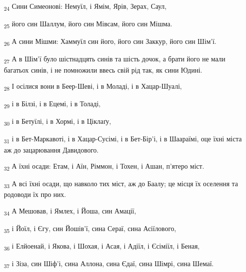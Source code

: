 \begin{tcolorbox}
\textsubscript{24} Сини Симеонові: Немуїл, і Ямім, Ярів, Зерах, Саул,
\end{tcolorbox}
\begin{tcolorbox}
\textsubscript{25} його син Шаллум, його син Мівсам, його син Мішма.
\end{tcolorbox}
\begin{tcolorbox}
\textsubscript{26} А сини Мішми: Хаммуїл син його, його син Заккур, його син Шім'ї.
\end{tcolorbox}
\begin{tcolorbox}
\textsubscript{27} А в Шім'ї було шістнадцять синів та шість дочок, а брати його не мали багатьох синів, і не помножили ввесь свій рід так, як сини Юдині.
\end{tcolorbox}
\begin{tcolorbox}
\textsubscript{28} І осілися вони в Беер-Шеві, і в Моладі, і в Хацар-Шуалі,
\end{tcolorbox}
\begin{tcolorbox}
\textsubscript{29} і в Білзі, і в Ецемі, і в Толаді,
\end{tcolorbox}
\begin{tcolorbox}
\textsubscript{30} і в Бетуїлі, і в Хормі, і в Ціклаґу,
\end{tcolorbox}
\begin{tcolorbox}
\textsubscript{31} і в Бет-Маркавоті, і в Хацар-Сусімі, і в Бет-Бір'і, і в Шаараїмі, оце їхні міста аж до зацарювання Давидового.
\end{tcolorbox}
\begin{tcolorbox}
\textsubscript{32} А їхні осади: Етам, і Аїн, Ріммон, і Тохен, і Ашан, п'ятеро міст.
\end{tcolorbox}
\begin{tcolorbox}
\textsubscript{33} А всі їхні осади, що навколо тих міст, аж до Баалу; це місця їх оселення та родоводи їх про них.
\end{tcolorbox}
\begin{tcolorbox}
\textsubscript{34} А Мешовав, і Ямлех, і Йоша, син Амації,
\end{tcolorbox}
\begin{tcolorbox}
\textsubscript{35} і Йоїл, і Єгу, син Йошів'ї, сина Сераї, сина Асіїлового,
\end{tcolorbox}
\begin{tcolorbox}
\textsubscript{36} і Елйоенай, і Якова, і Шохая, і Асая, і Адіїл, і Єсіміїл, і Беная,
\end{tcolorbox}
\begin{tcolorbox}
\textsubscript{37} і Зіза, син Шіф'і, сина Аллона, сина Єдаї, сина Шімрі, сина Шемаї.
\end{tcolorbox}
